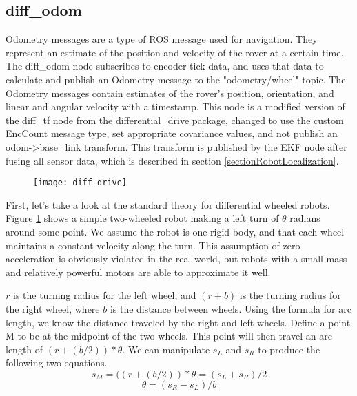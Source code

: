 \subsection{diff\_odom} \label{sectionOdomPublishing}

Odometry messages are a type of ROS message used for navigation. They represent an estimate of the position and velocity of the rover at a certain time. The diff\_odom node subscribes to encoder tick data, and uses that data to calculate and publish an Odometry message to the "odometry/wheel" topic. The Odometry messages contain estimates of the rover's position, orientation, and linear and angular velocity with a timestamp. This node is a modified version of the diff\_tf node from the differential\_drive package, changed to use the custom EncCount message type, set appropriate covariance values, and not publish an odom->base\_link transform. This transform is published by the EKF node after fusing all sensor data, which is described in section \ref{sectionRobotLocalization}.

\begin{figure}[h]
	\caption{\cite{differentialSteeringPaper}}
	\centering
	\texttt{[image: diff\_drive]}
	\label{figDiffDrive}
\end{figure}

First, let's take a look at the standard theory for differential wheeled robots. Figure \ref{figDiffDrive} shows a simple two-wheeled robot making a left turn of \(\theta\) radians around some point. We assume the robot is one rigid body, and that each wheel maintains a constant velocity along the turn. This assumption of zero acceleration is obviously violated in the real world, but robots with a small mass and relatively powerful motors are able to approximate it well. \cite{differentialSteeringPaper}

\(r\) is the turning radius for the left wheel, and \((r+b)\) is the turning radius for the right wheel, where \(b\) is the distance between wheels. Using the formula for arc length, we know the distance traveled by the right and left wheels. Define a point M to be at the midpoint of the two wheels. This point will then travel an arc length of \((r+(b/2)) * \theta \). We can manipulate \(s_L\) and \(s_R\) to produce the following two equations.
\begin{equation} \label{eqDiffSM}
s_M = ((r+(b/2)) * \theta = (s_L + s_R) / 2
\end{equation}
\begin{equation} \label{eqDiffTheta}
\theta = (s_R - s_L) / b
\end{equation}

